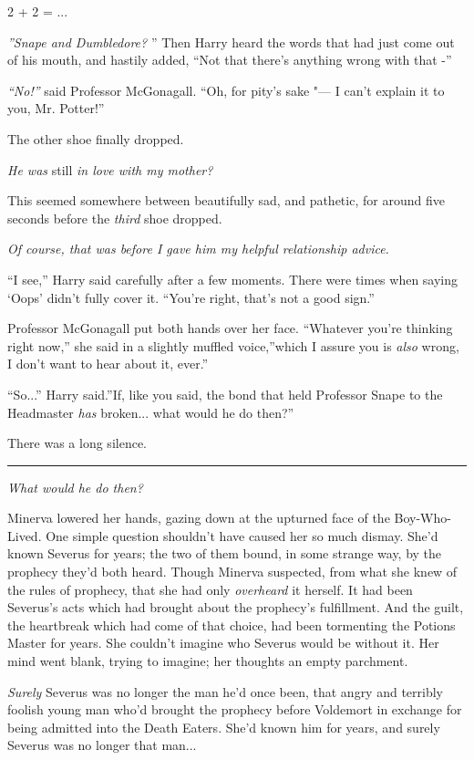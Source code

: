 2 + 2 = ...

\emph{''Snape and Dumbledore?} '' Then Harry heard the words that had just
come out of his mouth, and hastily added, ``Not that there's anything
wrong with that -''

\emph{``No!''} said Professor McGonagall. ``Oh, for pity's sake "--- I
can't explain it to you, Mr. Potter!''

The other shoe finally dropped.

\emph{He was} still \emph{in love with my mother?}

This seemed somewhere between beautifully sad, and pathetic, for around
five seconds before the \emph{third} shoe dropped.

\emph{Of course, that was before I gave him my helpful relationship
advice.}

``I see,'' Harry said carefully after a few moments. There were times
when saying `Oops' didn't fully cover it. ``You're right, that's not a
good sign.''

Professor McGonagall put both hands over her face. ``Whatever you're
thinking right now,'' she said in a slightly muffled voice,''which I
assure you is \emph{also} wrong, I don't want to hear about it, ever.''

``So...'' Harry said.''If, like you said, the bond that held
Professor Snape to the Headmaster \emph{has} broken... what would
he do then?''

There was a long silence.

\begin{center}\rule{3in}{0.4pt}\end{center}

\emph{What would he do then?}

Minerva lowered her hands, gazing down at the upturned face of the
Boy-Who-Lived. One simple question shouldn't have caused her so much
dismay. She'd known Severus for years; the two of them bound, in some
strange way, by the prophecy they'd both heard. Though Minerva
suspected, from what she knew of the rules of prophecy, that she had
only \emph{overheard} it herself. It had been Severus's acts which had
brought about the prophecy's fulfillment. And the guilt, the heartbreak
which had come of that choice, had been tormenting the Potions Master
for years. She couldn't imagine who Severus would be without it. Her
mind went blank, trying to imagine; her thoughts an empty parchment.

\emph{Surely} Severus was no longer the man he'd once been, that angry
and terribly foolish young man who'd brought the prophecy before
Voldemort in exchange for being admitted into the Death Eaters. She'd
known him for years, and surely Severus was no longer that man...

